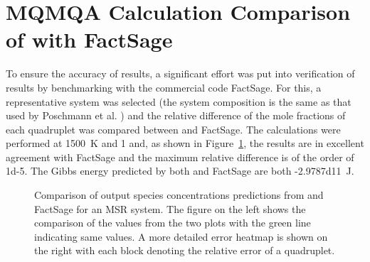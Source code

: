 \section{MQMQA Calculation Comparison of {\GEM} with FactSage}
To ensure the accuracy of results, a significant effort was put into verification of {\GEM} results by benchmarking with the commercial code FactSage. For this, a representative system was selected (the system composition is the same as that used by Poschmann et al. \cite{Poschmann:2021ab}) and the relative difference of the mole fractions of each quadruplet was compared between {\GEM} and FactSage. The calculations were performed at \SI{1500}{\kelvin} and \SI{1}{\atmosphere} and, as shown in Figure~\ref{fig:verif}, the results are in excellent agreement with FactSage and the maximum relative difference is of the order of \num{1d-5}. The Gibbs energy predicted by both {\GEM} and FactSage are both \SI{-2.9787d11}{\joule}. 
\begin{figure}[!ht]
    \hfill
    \caption[Comparison of output species concentrations predictions from {\GEM} and FactSage for an MSR system.]{Comparison of output species concentrations predictions from {\GEM} and FactSage for an MSR system. The figure on the left shows the comparison of the values from the two plots with the green line indicating same values. A more detailed error heatmap is shown on the right with each block denoting the relative error of a quadruplet.}
    \label{fig:verif}
\end{figure}
       
